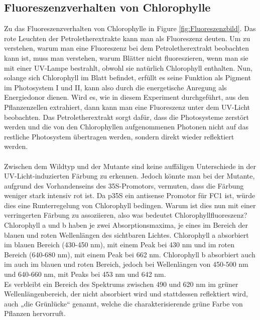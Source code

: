 \documentclass[10pt,a4paper]{article}
\begin{document}
		\subsection{Fluoreszenzverhalten von Chlorophylle}
			Zu das Fluoreszenzverhalten von Chlorophylle in Figure \ref{fig:Fluoreszenzbild}.
			Das rote Leuchten der Petroletherextrakte kann man als Fluoreszenz deuten. Um zu verstehen, warum man eine Fluoreszenz bei dem Petroletherextrakt beobachten kann ist, muss man verstehen, warum Blätter nicht fluoreszieren, wenn man sie mit einer UV-Lampe bestrahlt, obwohl sie natürlich Chlorophyll enthalten. Nun, solange sich Chlorophyll im Blatt befindet, erfüllt es seine Funktion als Pigment im Photosystem I und II, kann also durch die energetische Anregung als Energiedonor dienen. Wird es, wie in diesem Experiment durchgeführt, aus den Pflanzenzellen extrahiert, dann kann man eine Fluoreszenz unter dem UV-Licht beobachten. Das Petroletherextrakt sorgt dafür, dass die Photosysteme zerstört werden und die von den Chlorophyllen aufgenommenen Photonen nicht auf das restliche Photosystem übertragen werden, sondern direkt wieder reflektiert werden. \\
			\\
			Zwischen dem Wildtyp und der Mutante sind keine auffäligen Unterschiede in der UV-Licht-induzierten Färbung zu erkennen. Jedoch könnte man bei der Mutante, aufgrund des Vorhandenseins des 35S-Promotors, vermuten, dass die Färbung weniger stark intensiv rot ist. Da p35S ein antisense Promotor für FC1 ist, würde dies eine Runterregelung von Chlorophyll bedingen. Warum ist dies nun mit einer verringerten Färbung zu assoziieren, also was bedeutet Chlorophyllfluoreszenz?\\
			Chlorophyll a und b haben je zwei Absorptionsmaxima, je eines im Bereich der blauen und roten Wellenlängen des sichtbaren Lichtes. Chlorophyll a absorbiert im blauen Bereich (430-450 nm), mit einem Peak bei 430 nm und im roten Bereich (640-680 nm), mit einem Peak bei 662 nm. Chlorophyll b absorbiert auch im auch im blauen und roten Bereich, jedoch bei Wellenlängen von 450-500 nm und 640-660 nm, mit Peaks bei 453 nm und 642 nm. \\
			Es verbleibt ein Bereich des Spektrums zwischen 490 und 620 nm im grüner Wellenlängenbereich, der nicht absorbiert wird und stattdessen reflektiert wird, auch „die Grünlücke“ genannt, welche die charakterisierende grüne Farbe von Pflanzen hervorruft. 
\end{document}
